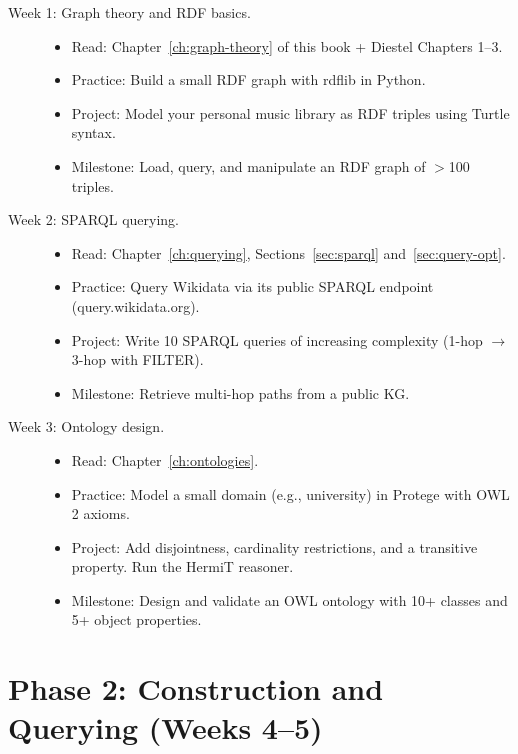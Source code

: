 \documentclass[11pt,a4paper,oneside,openany]{book}
\theoremstyle{definition}
\theoremstyle{plain}
\theoremstyle{remark}
\begin{document}
\begin{description}
	\item[Week 1: Graph theory and RDF basics.]
	      \begin{itemize}
		      \item Read: Chapter~\ref{ch:graph-theory} of this book + Diestel Chapters 1--3.
		      \item Practice: Build a small RDF graph with rdflib in Python.
		      \item Project: Model your personal music library as RDF triples using Turtle syntax.
		      \item Milestone: Load, query, and manipulate an RDF graph of $>$100 triples.
	      \end{itemize}

	\item[Week 2: SPARQL querying.]
	      \begin{itemize}
		      \item Read: Chapter~\ref{ch:querying}, Sections~\ref{sec:sparql} and~\ref{sec:query-opt}.
		      \item Practice: Query Wikidata via its public SPARQL endpoint (query.wikidata.org).
		      \item Project: Write 10 SPARQL queries of increasing complexity (1-hop $\to$ 3-hop with FILTER).
		      \item Milestone: Retrieve multi-hop paths from a public KG.
	      \end{itemize}

	\item[Week 3: Ontology design.]
	      \begin{itemize}
		      \item Read: Chapter~\ref{ch:ontologies}.
		      \item Practice: Model a small domain (e.g., university) in Protege with OWL 2 axioms.
		      \item Project: Add disjointness, cardinality restrictions, and a transitive property. Run the HermiT reasoner.
		      \item Milestone: Design and validate an OWL ontology with 10+ classes and 5+ object properties.
	      \end{itemize}
\end{description}

\section{Phase 2: Construction and Querying (Weeks 4--5)}\label{sec:phase2}
\end{document}
